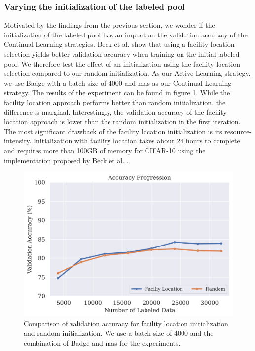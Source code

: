 \subsubsection{Varying the initialization of the labeled pool}
\label{sec:Evaluation:Results:CAL:Initialization}
Motivated by the findings from the previous section, we wonder if the initialization of the labeled pool has an impact on the validation accuracy of the Continual Learning strategies. Beck et al.\cite{beck2021effective} show that using a facility location selection 
\cite{iyer2021submodular} yields better validation accuracy when training on the initial labeled pool. We therefore test the effect of an initialization using the facility location selection compared to our random initialization. As our Active Learning strategy,
we use Badge with a batch size of 4000 and \gls{mas} as our Continual Learning strategy. The results of the experiment can be found in figure \ref{fig:Evaluation:Results:CAL:FLinit}. While the facility location approach performs better than random initialization, the difference is
marginal. Interestingly, the validation accuracy of the facility location approach is lower than the random initialization in the first iteration. The most significant drawback of the facility location initialization is its resource-intensity. Initialization with facility
location takes about 24 hours to complete and requires more than 100GB of memory for CIFAR-10 using the implementation proposed by Beck et al. \cite{beck2021effective}. \par

\begin{figure}[h]
    \centering
    \includegraphics[width=\linewidth]{images/results_CAL/Facility_location_init.png}
    \caption[Initialization using Facility Location]{Comparison of validation accuracy for facility location initialization and random initialization. We use a batch size of 4000 and the combination of Badge and \gls{mas} for the experiments.}
    \label{fig:Evaluation:Results:CAL:FLinit}
\end{figure}


